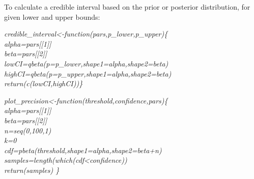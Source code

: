 \documentclass[12pt]{article}
\begin{document}
  To calculate a credible interval based on the prior or posterior distribution, for given lower and upper bounds:


  \vspace{12pt}
  \emph{
  credible\_interval\textless-function(pars,p\_lower,p\_upper)\{\\
    alpha=pars[[1]]\\
    beta=pars[[2]]\\
    lowCI=qbeta(p=p\_lower,shape1=alpha,shape2=beta)\\
    highCI=qbeta(p=p\_upper,shape1=alpha,shape2=beta)\\
    return(c(lowCI,highCI))\}
  }


  \vspace{12pt}
  \emph{
  plot\_precision\textless-function(threshold,confidence,pars)\{\\
    alpha=pars[[1]]\\
    beta=pars[[2]]\\
    n=seq(0,100,1)\\
    k=0\\
    cdf=pbeta(threshold,shape1=alpha,shape2=beta+n)\\
    samples=length(which(cdf<confidence))\\
    return(samples) \}
  }


\clearpage

     
\end{document}
